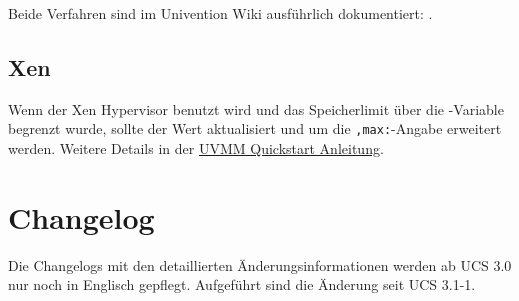 Beide Verfahren sind im Univention Wiki ausführlich dokumentiert:
.

\section{Xen} %
Wenn der Xen Hypervisor benutzt wird und das Speicherlimit über die \ucsUCR{}-Variable  begrenzt wurde, sollte der Wert aktualisiert und um die \texttt{,max:}-Angabe erweitert werden.
Weitere Details in der \href{http://wiki.univention.de/index.php?title=UVMM_Quickstart-3.1#Konfiguration_der_Dom0}{UVMM Quickstart Anleitung}.

\chapter{Changelog}

Die Changelogs mit den detaillierten Änderungsinformationen werden ab UCS 3.0
nur noch in Englisch gepflegt. Aufgeführt sind die Änderung seit UCS 3.1-1.







